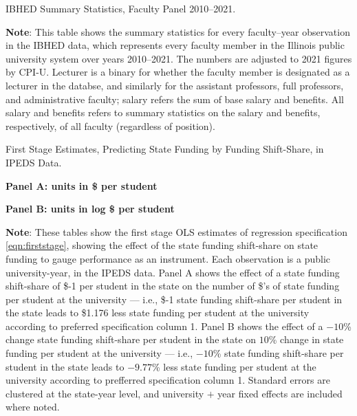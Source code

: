 \begin{table}[H]
    \singlespacing
    \centering
    \caption{IBHED Summary Statistics, Faculty Panel 2010--2021.}
    \makebox[\textwidth][c]{}
    \label{tab:illinois-summary}
    \justify
    \footnotesize
    \textbf{Note}:
    This table shows the summary statistics for every faculty--year observation in the IBHED data, which represents every faculty member in the Illinois public university system over years 2010--2021.
    The numbers are adjusted to 2021 figures by CPI-U.
    Lecturer is a binary for whether the faculty member is designated as a lecturer in the databse, and similarly for the assistant professors, full professors, and administrative faculty;
    salary refers the sum of base salary and benefits.
    All salary and benefits refers to summary statistics on the salary and benefits, respectively, of all faculty (regardless of position).
\end{table}


\begin{table}[H]
    \singlespacing
    \centering
    \caption{First Stage Estimates, Predicting State Funding by Funding Shift-Share, in IPEDS Data.}
    \textbf{Panel A: units in \$ per student}
    
    \makebox[\textwidth][c]{}
    
    \textbf{Panel B: units in log \$ per student}
    
    \makebox[\textwidth][c]{}

    \label{tab:firststage-reg}
    \justify
    \footnotesize
    \textbf{Note}:
    These tables show the first stage OLS estimates of regression specification \eqref{eqn:firststage}, showing the effect of the state funding shift-share on state funding to gauge performance as an instrument.
    Each observation is a public university-year, in the IPEDS data.
    Panel A shows the effect of a state funding shift-share of \$-1 per student in the state on the number of \$'s of state funding per student at the university --- i.e.,
    \$-1 state funding shift-share per student in the state leads to \$1.176 less state funding per student at the university according to preferred specification column 1.
    Panel B shows the effect of a $-10$\% change state funding shift-share per student in the state on $10$\% change in state funding per student at the university --- i.e.,
    $-10$\% state funding shift-share per student in the state leads to $-9.77$\% less state funding per student at the university according to prefferred specification column 1.        
    Standard errors are clustered at the state-year level, and university $+$ year fixed effects are included where noted.
\end{table}


